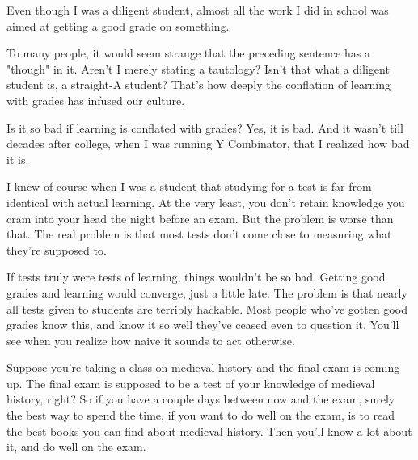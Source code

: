 Even
                  though I was a diligent student, almost all the work I did in
                  school was aimed at getting a good grade on something.

To
                  many people, it would seem strange that the preceding sentence
                  has a "though" in it. Aren't I merely stating a tautology?
                  Isn't that what a diligent student is, a straight-A student?
                  That's how deeply the conflation of learning with grades has
                  infused our culture.

Is it so bad if learning is
                  conflated with grades? Yes, it is bad. And it wasn't till
                  decades after college, when I was running Y Combinator,
                  that I realized how bad it is.

I knew of course
                  when I was a student that studying for a test is far from
                  identical with actual learning. At the very least, you don't
                  retain knowledge you cram into your head the night before an
                  exam. But the problem is worse than that. The real problem is
                  that most tests don't come close to measuring what they're
                  supposed to.

If tests truly were tests of learning,
                  things wouldn't be so bad. Getting good grades and learning
                  would converge, just a little late. The problem is that nearly
                  all tests given to students are terribly hackable. Most people
                  who've gotten good grades know this, and know it so well
                  they've ceased even to question it. You'll see when you
                  realize how naive it sounds to act otherwise.

Suppose
                  you're taking a class on medieval history and the final exam
                  is coming up. The final exam is supposed to be a test of your
                  knowledge of medieval history, right? So if you have a couple
                  days between now and the exam, surely the best way to spend
                  the time, if you want to do well on the exam, is to read the
                  best books you can find about medieval history. Then you'll
                  know a lot about it, and do well on the exam.


